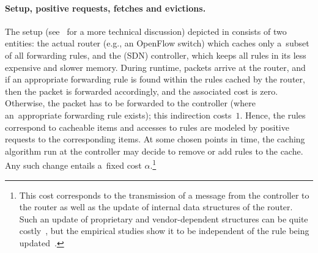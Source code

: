 \paragraph{Setup, positive requests, fetches and evictions.}

The setup (see~\cite{fibium-zipf} for a more technical discussion) depicted in
 consists of two entities: the actual router 
(e.g., an OpenFlow switch) which caches only a~subset of all forwarding rules,
and the (SDN) controller, which keeps all rules in its less expensive and
slower memory. During runtime, packets arrive at the router, and if an
appropriate forwarding rule is found within the rules cached by the router,
then the packet is forwarded accordingly, and the associated cost is zero.
Otherwise, the packet has to be forwarded to the controller (where 
an~appropriate forwarding rule exists); this indirection costs~$1$. Hence, the
rules correspond to cacheable items and accesses to rules are modeled by
positive requests to the corresponding items. At some chosen points in time,
the caching algorithm run at the controller may decide to remove or add rules
to the cache. Any such change entails a~fixed cost $\alpha$.\footnote{This
cost corresponds to the transmission of a message from the controller to the
router as well as the update of internal data structures of the router. Such
an update of proprietary and vendor-dependent structures can be quite
costly~\cite{tcam-expensive-updates}, but the empirical studies show it to be
independent of the rule being updated~\cite{fib-updates}.}

